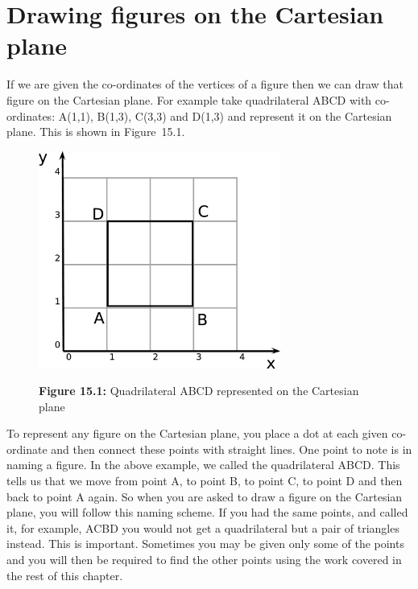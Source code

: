             \section{ Drawing figures on the Cartesian plane}
            \nopagebreak
            \label{m39107*eip-728}If we are given the co-ordinates of the vertices of a figure then we can draw that figure on the Cartesian plane. For example take quadrilateral ABCD with co-ordinates: A(1,1), B(1,3), C(3,3) and D(1,3) and represent it on the Cartesian plane. This is shown in Figure~15.1.   
\par \label{m39107*eip-199}
    \setcounter{subfigure}{0}
	\begin{figure}[H] %
    \begin{center}
    \label{m39107*id63458!!!underscore!!!media}\label{m39107*id63458!!!underscore!!!printimage}\includegraphics[width=300px]{col11306.imgs/m39107_square.png} %
      \vspace{2pt}
    \vspace{\rubberspace}\par \begin{cnxcaption}
	  \small \textbf{Figure 15.1: }Quadrilateral ABCD represented on the Cartesian plane
	\end{cnxcaption}
    \vspace{.1in}
    \end{center}
 \end{figure}       
\par \label{m39107*eip-645}To represent any figure on the Cartesian plane, you place a dot at each given co-ordinate and then connect these points with straight lines. One point to note is in naming a figure. In the above example, we called the quadrilateral ABCD. This tells us that we move from point A, to point B, to point C, to point D and then back to point A again. So when you are asked to draw a figure on the Cartesian plane, you will follow this naming scheme. If you had the same points, and called it, for example, ACBD you would not get a quadrilateral but a pair of triangles instead. This is important. Sometimes you may be given only some of the points and you will then be required to find the other points using the work covered in the rest of this chapter. \par \label{m39107*uid37}
